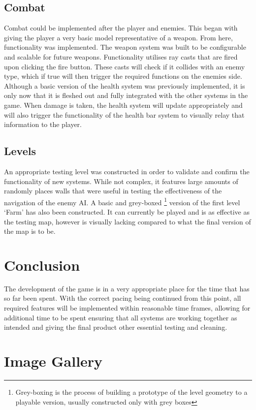 \documentclass[11pt]{article}
\begin{document}
\subsection{Combat}
Combat could be implemented after the player and enemies. This began with giving the player a very basic model representative of a weapon. From here, functionality was implemented. The weapon system was built to be configurable and scalable for future weapons. Functionality utilises ray casts that are fired upon clicking the fire button. These casts will check if it collides with an enemy type, which if true will then trigger the required functions on the enemies side.
Although a basic version of the health system was previously implemented, it is only now that it is fleshed out and fully integrated with the other systems in the game. When damage is taken, the health system will update appropriately and will also trigger the functionality of the health bar system to visually relay that information to the player. \\

\subsection{Levels}
An appropriate testing level was constructed in order to validate and confirm the functionality of new systems. While not complex, it features large amounts of randomly places walls that were useful in testing the effectiveness of the navigation of the enemy AI.
A basic and grey-boxed \footnote{Grey-boxing is the process of building a prototype of the level geometry to a playable version, usually constructed only with grey boxes} version of the first level ‘Farm’ has also been constructed. It can currently be played and is as effective as the testing map, however is visually lacking compared to what the final version of the map is to be. \\

\section{Conclusion}
The development of the game is in a very appropriate place for the time that has so far been spent. With the correct pacing being continued from this point, all required features will be implemented within reasonable time frames, allowing for additional time to be spent ensuring that all systems are working together as intended and giving the final product other essential testing and cleaning. \\

\clearpage

\appendix

\section{Image Gallery}


\clearpage
\end{document}
